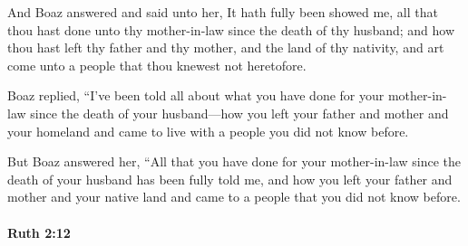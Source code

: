 			\begin{versebox}
					\item[BHS] 
					\item[LXX] 
					\item[ASV] And Boaz answered and said unto her, It hath fully been showed me, all that thou hast done unto thy mother-in-law since the death of thy husband; and how thou hast left thy father and thy mother, and the land of thy nativity, and art come unto a people that thou knewest not heretofore.
					\item[NIV] Boaz replied, “I’ve been told all about what you have done for your mother-in-law since the death of your husband—how you left your father and mother and your homeland and came to live with a people you did not know before.
					\item[NRSV] But Boaz answered her, “All that you have done for your mother-in-law since the death of your husband has been fully told me, and how you left your father and mother and your native land and came to a people that you did not know before.
			\end{versebox}

		\paragraph{Ruth 2:12} %
			\label{RUTH-2-12}


